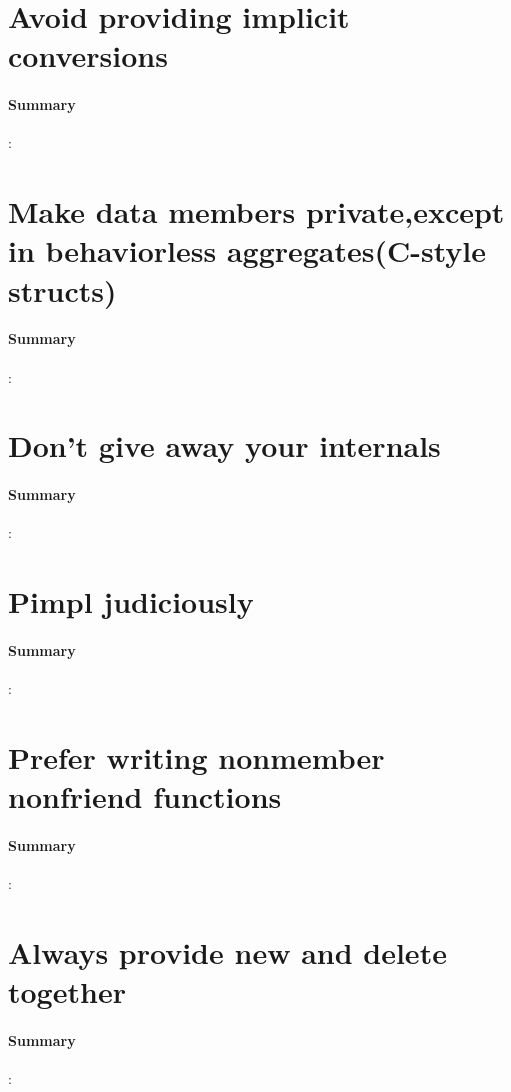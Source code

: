 \documentclass[UTF8,a4paper,12pt]{ctexbook}
\begin{document}
		
	\section{Avoid providing implicit conversions}
		\paragraph{Summary}:
		
		
	\section{Make data members private,except in behaviorless aggregates(C-style structs)}
		\paragraph{Summary}:
		
		
	\section{Don't give away your internals}
		\paragraph{Summary}:
		
		
	\section{Pimpl judiciously}
		\paragraph{Summary}:
		
		
	\section{Prefer writing nonmember nonfriend functions}
		\paragraph{Summary}:
		
		
	\section{Always provide new and delete together}
		\paragraph{Summary}:
		
\end{document}
